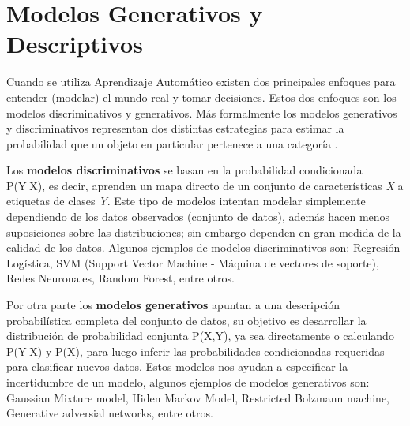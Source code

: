 
\section{Modelos Generativos y Descriptivos}

Cuando se utiliza Aprendizaje Autom\'{a}tico existen dos principales enfoques para entender (modelar) el mundo real y tomar decisiones. Estos dos enfoques son los modelos discriminativos y generativos. M\'{a}s formalmente los modelos generativos y discriminativos representan dos distintas estrategias para estimar la probabilidad que un objeto en particular pertenece a una categor\'{i}a \cite{42}.


\vspace{5mm} %

Los \textbf{modelos discriminativos} se basan en la probabilidad condicionada P(Y|X), es decir, aprenden un mapa directo de un conjunto de caracter\'{i}sticas \textit{X} a etiquetas de clases \textit{Y}. Este tipo de modelos intentan modelar simplemente dependiendo de los datos observados (conjunto de datos), adem\'{a}s hacen menos suposiciones sobre las distribuciones; sin embargo dependen en gran medida de la calidad de los datos. Algunos ejemplos de modelos discriminativos son: Regresi\'{o}n Log\'{i}stica, SVM (Support Vector Machine - M\'{a}quina de vectores de soporte), Redes Neuronales, Random Forest, entre otros.

\vspace{5mm} %

Por otra parte los \textbf{modelos generativos} apuntan a una descripci\'{o}n probabil\'{i}stica completa del conjunto de datos, su objetivo es desarrollar la distribuci\'{o}n de probabilidad conjunta P(X,Y), ya sea directamente o calculando P(Y|X) y P(X), para luego inferir las probabilidades condicionadas requeridas para clasificar nuevos datos. Estos modelos nos ayudan a especificar la incertidumbre de un modelo, algunos ejemplos de modelos generativos son: Gaussian Mixture model, Hiden Markov Model, Restricted Bolzmann machine, Generative adversial networks, entre otros.

\vspace{5mm} %

